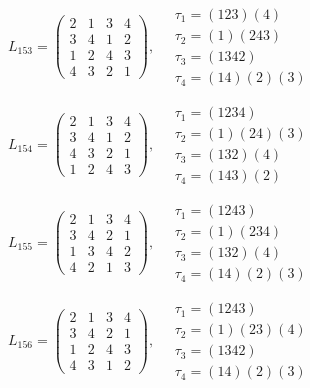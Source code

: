 $L_{153} = \begin{pmatrix} 2 & 1 & 3 & 4 \\ 3 & 4 & 1 & 2 \\ 1 & 2 & 4 & 3 \\ 4 & 3 & 2 & 1 \end{pmatrix}, \quad \begin{matrix} \tau_{1} = (1 2 3)(4) \\ \tau_{2} = (1)(2 4 3) \\ \tau_{3} = (1 3 4 2) \\ \tau_{4} = (1 4)(2)(3) \end{matrix}$

$L_{154} = \begin{pmatrix} 2 & 1 & 3 & 4 \\ 3 & 4 & 1 & 2 \\ 4 & 3 & 2 & 1 \\ 1 & 2 & 4 & 3 \end{pmatrix}, \quad \begin{matrix} \tau_{1} = (1 2 3 4) \\ \tau_{2} = (1)(2 4)(3) \\ \tau_{3} = (1 3 2)(4) \\ \tau_{4} = (1 4 3)(2) \end{matrix}$

$L_{155} = \begin{pmatrix} 2 & 1 & 3 & 4 \\ 3 & 4 & 2 & 1 \\ 1 & 3 & 4 & 2 \\ 4 & 2 & 1 & 3 \end{pmatrix}, \quad \begin{matrix} \tau_{1} = (1 2 4 3) \\ \tau_{2} = (1)(2 3 4) \\ \tau_{3} = (1 3 2)(4) \\ \tau_{4} = (1 4)(2)(3) \end{matrix}$

$L_{156} = \begin{pmatrix} 2 & 1 & 3 & 4 \\ 3 & 4 & 2 & 1 \\ 1 & 2 & 4 & 3 \\ 4 & 3 & 1 & 2 \end{pmatrix}, \quad \begin{matrix} \tau_{1} = (1 2 4 3) \\ \tau_{2} = (1)(2 3)(4) \\ \tau_{3} = (1 3 4 2) \\ \tau_{4} = (1 4)(2)(3) \end{matrix}$

